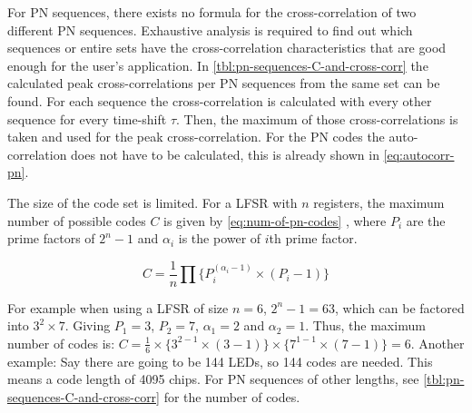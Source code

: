 For PN sequences, there exists no formula for the cross-correlation of two different PN sequences. 
Exhaustive analysis is required to find out which sequences or entire sets have the cross-correlation characteristics that are good enough for the user's application.
In \autoref{tbl:pn-sequences-C-and-cross-corr} the calculated peak cross-correlations per PN sequences from the same set can be found.
For each sequence the cross-correlation is calculated with every other sequence for every time-shift $\tau$. 
Then, the maximum of those cross-correlations is taken and used for the peak cross-correlation.
For the PN codes the auto-correlation does not have to be calculated, this is already shown in \autoref{eq:autocorr-pn}.



The size of the code set is limited.
For a LFSR with $n$ registers, the maximum number of possible codes $C$ is given by \autoref{eq:num-of-pn-codes} \cite{mutagi1996pseudo}, where $P_i$ are the prime factors of $2^n - 1$ and $\alpha_i$ is the power of $i$th prime factor.

\begin{equation}
	\label{eq:num-of-pn-codes}
	C = \frac{1}{n} \prod \{ P_{i} ^ {(\alpha_i - 1)} \times (P_i - 1) \}
\end{equation}

For example when using a LFSR of size $n = 6$, $2^n - 1 = 63$, which can be factored into $3^2 \times 7$.
Giving $P_1 = 3$, $P_2 = 7$, $\alpha_1 = 2$ and $\alpha_2 = 1$.
Thus, the maximum number of codes is: $C = \frac{1}{6} \times \{ 3^{2 - 1} \times (3 - 1) \} \times \{ 7^{1 - 1} \times (7 - 1) \} = 6$.
Another example: Say there are going to be 144 LEDs, so 144 codes are needed. 
This means a code length of 4095 chips.
For PN sequences of other lengths, see \autoref{tbl:pn-sequences-C-and-cross-corr} for the number of codes.


